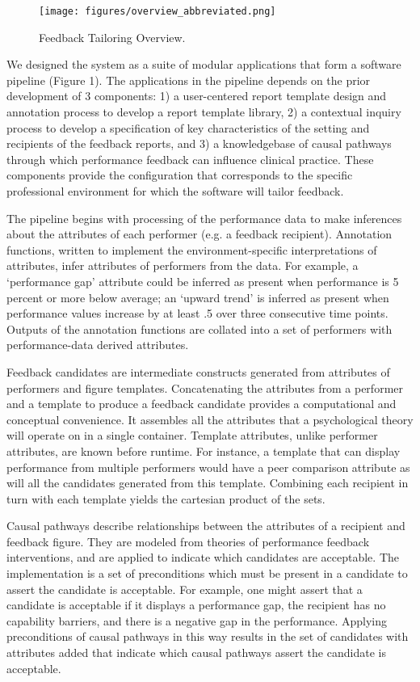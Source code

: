 \documentclass{amia}
\begin{document}
\begin{figure}[h!]
\centering
\texttt{[image: figures/overview\_abbreviated.png]}
\caption{Feedback Tailoring Overview.}
\label{fig1}
\end{figure}

We designed the system as a suite of modular applications that form a software pipeline (Figure 1). The applications in the pipeline depends on the prior development of 3 components: 1) a user-centered report template design and annotation process to develop a report template library, 2) a contextual inquiry process to develop a specification of key characteristics of the setting and recipients of the feedback reports, and 3) a knowledgebase of causal pathways through which performance feedback can influence clinical practice.
These components provide the configuration that corresponds to the specific professional environment for which the software will tailor feedback.

The pipeline begins with processing of the performance data to make inferences about the attributes of each performer (e.g. a feedback recipient). Annotation functions, written to implement the environment-specific interpretations of attributes, infer attributes of performers from the data. For example, a `performance gap' attribute could be inferred as present when performance is 5 percent or more below average; an `upward trend' is inferred as present when performance values increase by at least .5 over three consecutive time points.
Outputs of the annotation functions are collated into a set of performers with performance-data derived attributes.

Feedback candidates are intermediate constructs generated from attributes of performers and figure templates.
Concatenating the attributes from a performer and a template to produce a feedback candidate provides a computational and conceptual convenience.
It assembles all the attributes that a psychological theory will operate on in a single container.
Template attributes, unlike performer attributes, are known before runtime.
For instance, a template that can display performance from multiple performers would have a peer comparison attribute as will all the candidates generated from this template.
Combining each recipient in turn with each template yields the cartesian product of the sets.

Causal pathways describe relationships between the attributes of a recipient and feedback figure.
They are modeled from theories of performance feedback interventions\cite{kluger1996}, and are applied to indicate which candidates are acceptable.
The implementation is a set of preconditions which must be present in a candidate to assert the candidate is acceptable.
For example, one might assert that a candidate is acceptable if it displays a performance gap, the recipient has no capability barriers, and there is a negative gap in the performance.
Applying preconditions of causal pathways in this way results in the set of candidates with attributes added that indicate which causal pathways assert the candidate is acceptable.
\end{document}
